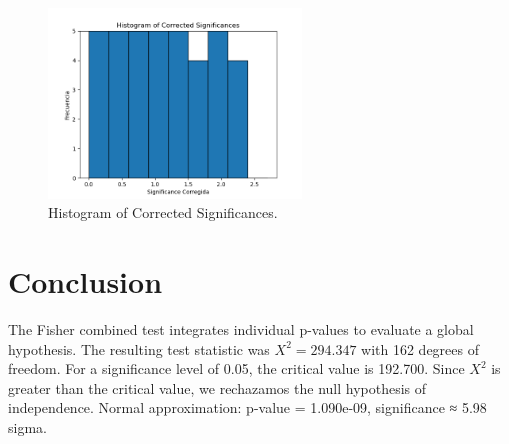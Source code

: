 \documentclass[12pt]{article}
\begin{document}
\begin{figure}[h!]
\centering
\includegraphics[width=0.6\textwidth]{corrected_significance_hist.png}
\caption{Histogram of Corrected Significances.}
\end{figure}

\section*{Conclusion}
The Fisher combined test integrates individual p-values to evaluate a global hypothesis.
The resulting test statistic was $X^2 = 294.347$ with 162 degrees of freedom.
For a significance level of 0.05, the critical value is 192.700.
Since $X^2$ is greater than the critical value, we rechazamos the null hypothesis of independence.
Normal approximation: p-value = 1.090e-09, significance ≈ 5.98 sigma.
\end{document}
